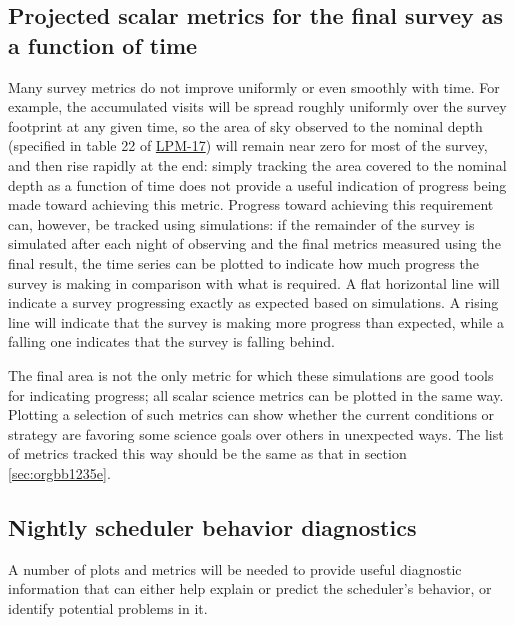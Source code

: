 \subsection{Projected scalar metrics for the final survey as a function of time}
\label{sec:org9d0f697}
Many survey metrics do not improve uniformly or even smoothly with time.
For example, the accumulated visits will be spread roughly uniformly over the survey footprint at any given time, so the area of sky observed to the nominal depth (specified in table 22 of \href{http://ls.st/lpm-17}{LPM-17}) will remain near zero for most of the survey, and then rise rapidly at the end: simply tracking the area covered to the nominal depth as a function of time does not provide a useful indication of progress being made toward achieving this metric.
Progress toward achieving this requirement can, however, be tracked using simulations: if the remainder of the survey is simulated after each night of observing and the final metrics measured using the final result, the time series can be plotted to indicate how much progress the survey is making in comparison with what is required.
A flat horizontal line will indicate a survey progressing exactly as expected based on simulations.
A rising line will indicate that the survey is making more progress than expected, while a falling one indicates that the survey is falling behind.

The final area is not the only metric for which these simulations are good tools for indicating progress; all scalar science metrics can be plotted in the same way. Plotting a selection of such metrics can show whether the current conditions or strategy are favoring some science goals over others in unexpected ways.
The list of metrics tracked this way should be the same as that in section \ref{sec:orgbb1235e}.

\subsection{Nightly scheduler behavior diagnostics}
\label{sec:org7a89e1c}
A number of plots and metrics will be needed to provide useful diagnostic information that can either help explain or predict the scheduler's behavior, or identify potential problems in it.

